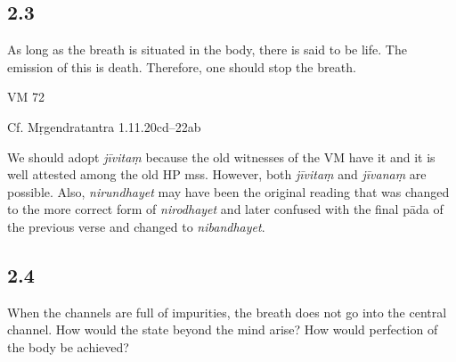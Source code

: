 \begin{ekdosis}
\subsection*{2.3}
\begin{translation}[hp02_003]
As long as the breath is situated in the body, there is said to be life. The emission of this is death. Therefore, one should stop the breath.
\end{translation}

\begin{sources}[hp02_003]
VM 72

\begin{versinnote}
\end{versinnote}
Cf. Mṛgendratantra 1.11.20cd--22ab

\begin{versinnote}
\end{versinnote}
\end{sources}

\begin{testimonia}[hp02_003]
\end{testimonia}

\begin{philcomm}[hp02_003]
We should adopt \emph{jīvitaṃ} because the old witnesses of the VM have it and it is well attested among the old HP mss. However, both \emph{jīvitaṃ} and \emph{jīvanaṃ} are possible. Also, \emph{nirundhayet} may have been the original reading that was  changed to the more correct form of \emph{nirodhayet} and later confused with the final pāda of the previous verse and changed to \emph{nibandhayet}.
\end{philcomm}

\subsection*{2.4}
\begin{translation}[hp02_004]
When the channels are full of impurities, the breath does not go into the central channel. How would the state beyond the mind arise? How would perfection of the body be achieved?
\end{translation}


\end{ekdosis}
